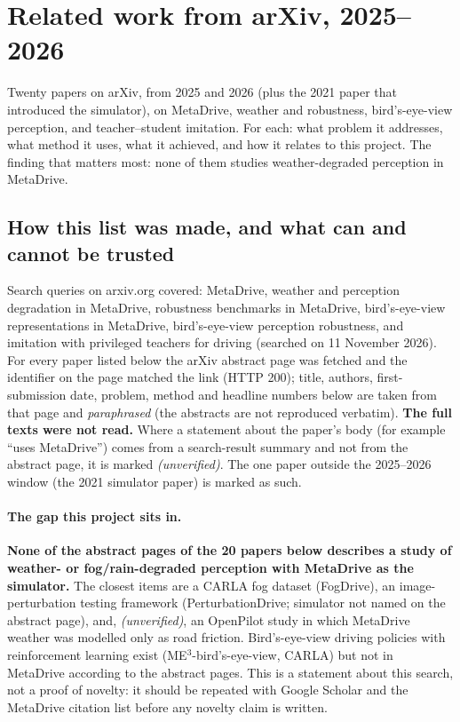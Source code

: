 \section{Related work from arXiv, 2025--2026}\label{sec:related}

\begin{plainwords}
Twenty papers on arXiv, from 2025 and 2026 (plus the 2021 paper that introduced the simulator), on MetaDrive, weather and robustness, bird's-eye-view perception, and teacher--student imitation. For each: what problem it addresses, what method it uses, what it achieved, and how it relates to this project. The finding that matters most: none of them studies weather-degraded perception in MetaDrive.
\end{plainwords}


\subsection{How this list was made, and what can and cannot be trusted}
Search queries on arxiv.org covered: MetaDrive, weather and perception degradation in MetaDrive, robustness benchmarks in MetaDrive, bird's-eye-view representations in MetaDrive, bird's-eye-view perception robustness, and imitation with privileged teachers for driving (searched on 11 November 2026).
For every paper listed below the arXiv abstract page was fetched and the identifier on the page matched the link (HTTP 200); title, authors, first-submission date, problem, method and headline numbers below are taken from that page and \emph{paraphrased} (the abstracts are not reproduced verbatim).
\textbf{The full texts were not read.} Where a statement about the paper's body (for example ``uses MetaDrive'') comes from a search-result summary and not from the abstract page, it is marked \emph{(unverified)}. The one paper outside the 2025--2026 window (the 2021 simulator paper) is marked as such.

\paragraph{The gap this project sits in.} \textbf{None of the abstract pages of the 20 papers below describes a study of weather- or fog/rain-degraded perception with MetaDrive as the simulator.} The closest items are a CARLA fog dataset (FogDrive), an image-perturbation testing framework (PerturbationDrive; simulator not named on the abstract page), and, \emph{(unverified)}, an OpenPilot study in which MetaDrive weather was modelled only as road friction.
Bird's-eye-view driving policies with reinforcement learning exist (ME$^3$-bird's-eye-view, CARLA) but not in MetaDrive according to the abstract pages. This is a statement about this search, not a proof of novelty: it should be repeated with Google Scholar and the MetaDrive citation list before any novelty claim is written.

